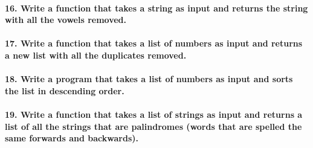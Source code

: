 \documentclass[11pt]{article}
\begin{document}
\hypertarget{write-a-function-that-takes-a-string-as-input-and-returns-the-string-with-all-the-vowels-removed.}{%
\paragraph{16. Write a function that takes a string as input and returns
the string with all the vowels
removed.}\label{write-a-function-that-takes-a-string-as-input-and-returns-the-string-with-all-the-vowels-removed.}}

\hypertarget{write-a-function-that-takes-a-list-of-numbers-as-input-and-returns-a-new-list-with-all-the-duplicates-removed.}{%
\paragraph{17. Write a function that takes a list of numbers as input
and returns a new list with all the duplicates
removed.}\label{write-a-function-that-takes-a-list-of-numbers-as-input-and-returns-a-new-list-with-all-the-duplicates-removed.}}

\hypertarget{write-a-program-that-takes-a-list-of-numbers-as-input-and-sorts-the-list-in-descending-order.}{%
\paragraph{18. Write a program that takes a list of numbers as input and
sorts the list in descending
order.}\label{write-a-program-that-takes-a-list-of-numbers-as-input-and-sorts-the-list-in-descending-order.}}

\hypertarget{write-a-function-that-takes-a-list-of-strings-as-input-and-returns-a-list-of-all-the-strings-that-are-palindromes-words-that-are-spelled-the-same-forwards-and-backwards.}{%
\paragraph{19. Write a function that takes a list of strings as input
and returns a list of all the strings that are palindromes (words that
are spelled the same forwards and
backwards).}\label{write-a-function-that-takes-a-list-of-strings-as-input-and-returns-a-list-of-all-the-strings-that-are-palindromes-words-that-are-spelled-the-same-forwards-and-backwards.}}
\end{document}
